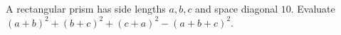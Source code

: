 A rectangular prism has side lengths $a,b,c$ and space diagonal $10$. Evaluate $(a+b)^2+(b+c)^2+(c+a)^2-(a+b+c)^2$.
